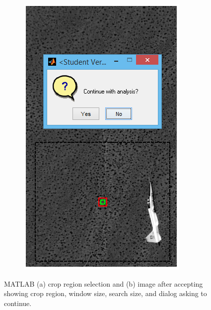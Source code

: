 \documentclass[letterpaper,12pt]{article}
\begin{document}
\begin{figure}[h]
\begin{subfigure}[b]{0.35\textwidth}
        \includegraphics[width=\textwidth]{Crop_Image_Accept.PNG}
        \caption{}
        \label{fig:Crop_Image_Accept}
    \end{subfigure}
 	
    \caption{MATLAB (a) crop region selection and (b) image after accepting showing crop region, window size, search size, and dialog asking to continue.}
    \label{fig:Crop_Image_And_Accept}
\end{figure}
\end{document}
